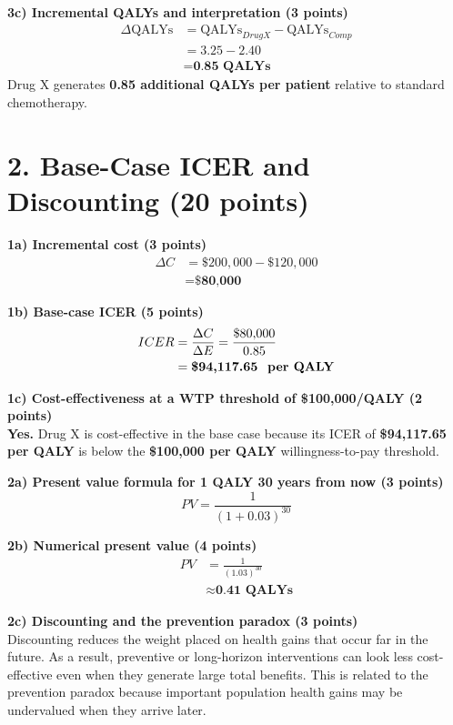 \documentclass[11pt, letterpaper]{article}
\begin{document}
\textbf{3c) Incremental QALYs and interpretation (3 points)} \\
\begin{align*}
\Delta \text{QALYs} &= \text{QALYs}_{Drug X} - \text{QALYs}_{Comp} \\
&= 3.25 - 2.40 \\
&= \textbf{0.85 \ QALYs}
\end{align*}
Drug X generates \textbf{0.85 additional QALYs per patient} relative to standard chemotherapy.

\section*{2. Base-Case ICER and Discounting (20 points)}

\textbf{1a) Incremental cost (3 points)} \\
\begin{align*}
\Delta C &= \$200{,}000 - \$120{,}000 \\
&= \textbf{\$80{,}000}
\end{align*}

\textbf{1b) Base-case ICER (5 points)} \\
\begin{align*}
ICER &= \frac{\Delta C}{\Delta E} = \frac{\$80{,}000}{0.85} \\
&= \textbf{\$94{,}117.65 \text{ per QALY}}
\end{align*}

\textbf{1c) Cost-effectiveness at a WTP threshold of \$100,000/QALY (2 points)} \\
\textbf{Yes.} Drug X is cost-effective in the base case because its ICER of \textbf{\$94,117.65 per QALY} is below the \textbf{\$100,000 per QALY} willingness-to-pay threshold.

\textbf{2a) Present value formula for 1 QALY 30 years from now (3 points)} \\
\[
PV = \frac{1}{(1+0.03)^{30}}
\]

\textbf{2b) Numerical present value (4 points)} \\
\begin{align*}
PV &= \frac{1}{(1.03)^{30}} \\
&\approx \textbf{0.41 \ QALYs}
\end{align*}

\textbf{2c) Discounting and the prevention paradox (3 points)} \\
Discounting reduces the weight placed on health gains that occur far in the future. As a result, preventive or long-horizon interventions can look less cost-effective even when they generate large total benefits. This is related to the prevention paradox because important population health gains may be undervalued when they arrive later.
\end{document}
